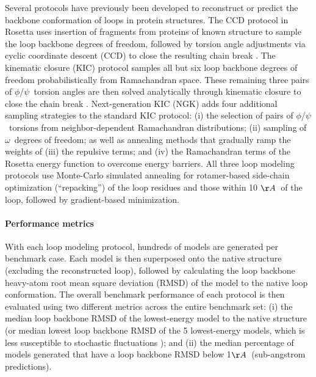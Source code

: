 Several protocols have previously been developed to reconstruct or predict the backbone conformation of loops in protein structures. The CCD protocol in Rosetta \cite{wang_proteinprotein_2007} uses insertion of fragments from proteins of known structure to sample the loop backbone degrees of freedom, followed by torsion angle adjustments via cyclic coordinate descent (CCD) to close the resulting chain break \cite{canutescu_cyclic_2003}. The kinematic closure (KIC) protocol \cite{mandell_sub-angstrom_2009} samples all but six loop backbone degrees of freedom probabilistically from Ramachandran space. These remaining three pairs of $\phi$/$\psi$\ torsion angles are then solved analytically through kinematic closure to close the chain break \cite{coutsias_kinematic_2004}. Next-generation KIC (NGK) \cite{stein_improvements_2013} adds four additional sampling strategies to the standard KIC protocol: (i) the selection of pairs of $\phi$/$\psi$\ torsions from neighbor-dependent Ramachandran distributions; (ii) sampling of $\omega$\ degrees of freedom; as well as annealing methods that gradually ramp the weights of (iii) the repulsive terms; and (iv) the Ramachandran terms of the Rosetta energy function to overcome energy barriers. All three loop modeling protocols use Monte-Carlo simulated annealing for rotamer-based side-chain optimization (``repacking'') of the loop residues and those within 10 $\AA$\ of the loop, followed by gradient-based minimization.
\paragraph{Performance metrics}
With each loop modeling protocol, hundreds of models are generated per benchmark case. Each model is then superposed onto the native structure (excluding the reconstructed loop), followed by calculating the loop backbone heavy-atom root mean square deviation (RMSD) of the model to the native loop conformation. The overall benchmark performance of each protocol is then evaluated using two different metrics across the entire benchmark set: (i) the median loop backbone RMSD of the lowest-energy model to the native structure (or median lowest loop backbone RMSD of the 5 lowest-energy models, which is less susceptible to stochastic fluctuations \cite{leaver-fay_chapter_2013}); and (ii) the median percentage of models generated that have a loop backbone RMSD below 1$\AA$\ (sub-angstrom predictions).

